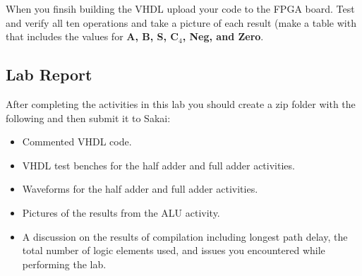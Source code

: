 When you finsih building the VHDL upload your code to the FPGA board. Test and verify all ten operations and take a picture of each result (make a table with that includes the values for {\bf A, B, S, C$_4$, Neg, and Zero}.

\subsection{Lab Report}
After completing the activities in this lab you should create a zip folder with the following and then submit it to Sakai:

\begin{itemize}
	\item Commented VHDL code.
	\item VHDL test benches for the half adder and full adder activities.
	\item Waveforms for the half adder and full adder activities.
	\item Pictures of the results from the ALU activity.
	\item A discussion on the results of compilation including longest path delay, the total number of logic elements used, and issues you encountered while performing the lab.
\end{itemize}

